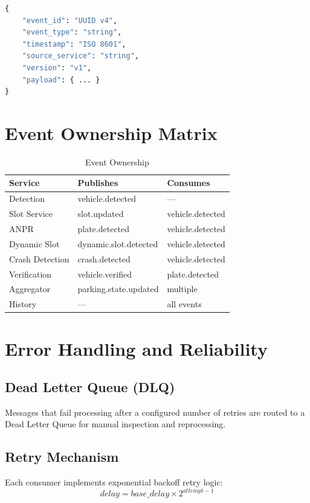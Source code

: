 \documentclass[12pt,a4paper]{report}
\begin{document}
\begin{lstlisting}[language=Python, caption=Event Envelope Format]
{
    "event_id": "UUID v4",
    "event_type": "string",
    "timestamp": "ISO 8601",
    "source_service": "string",
    "version": "v1",
    "payload": { ... }
}
\end{lstlisting}

\section{Event Ownership Matrix}

\begin{table}[H]
\centering
\caption{Event Ownership}
\begin{tabular}{|l|l|l|}
\hline
\textbf{Service} & \textbf{Publishes} & \textbf{Consumes} \\
\hline
Detection & vehicle.detected & --- \\
\hline
Slot Service & slot.updated & vehicle.detected \\
\hline
ANPR & plate.detected & vehicle.detected \\
\hline
Dynamic Slot & dynamic.slot.detected & vehicle.detected \\
\hline
Crash Detection & crash.detected & vehicle.detected \\
\hline
Verification & vehicle.verified & plate.detected \\
\hline
Aggregator & parking.state.updated & multiple \\
\hline
History & --- & all events \\
\hline
\end{tabular}
\end{table}

\section{Error Handling and Reliability}

\subsection{Dead Letter Queue (DLQ)}
Messages that fail processing after a configured number of retries are routed to a Dead Letter Queue for manual inspection and reprocessing.

\subsection{Retry Mechanism}
Each consumer implements exponential backoff retry logic:
\begin{equation}
delay = base\_delay \times 2^{attempt - 1}
\end{equation}
\end{document}
